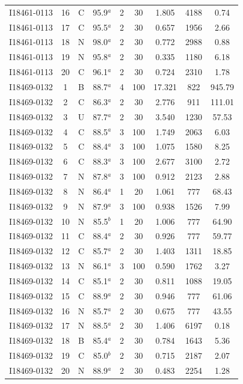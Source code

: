 \begin{table}
\begin{tabular}{ccccccccc}
I18461-0113 & 16 & C & 95.9$^{a}$ & 2 & 30 & 1.805 & 4188 & 0.74 \\
I18461-0113 & 17 & C & 95.5$^{a}$ & 2 & 30 & 0.657 & 1956 & 2.66 \\
I18461-0113 & 18 & N & 98.0$^{a}$ & 2 & 30 & 0.772 & 2988 & 0.88 \\
I18461-0113 & 19 & N & 95.8$^{a}$ & 2 & 30 & 0.335 & 1180 & 6.18 \\
I18461-0113 & 20 & C & 96.1$^{a}$ & 2 & 30 & 0.724 & 2310 & 1.78 \\
I18469-0132 & 1 & B & 88.7$^{a}$ & 4 & 100 & 17.321 & 822 & 945.79 \\
I18469-0132 & 2 & C & 86.3$^{a}$ & 2 & 30 & 2.776 & 911 & 111.01 \\
I18469-0132 & 3 & U & 87.7$^{a}$ & 2 & 30 & 3.540 & 1230 & 57.53 \\
I18469-0132 & 4 & C & 88.5$^{a}$ & 3 & 100 & 1.749 & 2063 & 6.03 \\
I18469-0132 & 5 & C & 88.4$^{a}$ & 3 & 100 & 1.075 & 1580 & 8.25 \\
I18469-0132 & 6 & C & 88.3$^{a}$ & 3 & 100 & 2.677 & 3100 & 2.72 \\
I18469-0132 & 7 & N & 87.8$^{a}$ & 3 & 100 & 0.912 & 2123 & 2.88 \\
I18469-0132 & 8 & N & 86.4$^{a}$ & 1 & 20 & 1.061 & 777 & 68.43 \\
I18469-0132 & 9 & N & 87.9$^{a}$ & 3 & 100 & 0.938 & 1526 & 7.99 \\
I18469-0132 & 10 & N & 85.5$^{b}$ & 1 & 20 & 1.006 & 777 & 64.90 \\
I18469-0132 & 11 & C & 88.4$^{a}$ & 2 & 30 & 0.926 & 777 & 59.77 \\
I18469-0132 & 12 & C & 85.7$^{a}$ & 2 & 30 & 1.403 & 1311 & 18.85 \\
I18469-0132 & 13 & N & 86.1$^{a}$ & 3 & 100 & 0.590 & 1762 & 3.27 \\
I18469-0132 & 14 & C & 85.1$^{a}$ & 2 & 30 & 0.811 & 1088 & 19.05 \\
I18469-0132 & 15 & C & 88.9$^{a}$ & 2 & 30 & 0.946 & 777 & 61.06 \\
I18469-0132 & 16 & N & 85.7$^{a}$ & 2 & 30 & 0.675 & 777 & 43.55 \\
I18469-0132 & 17 & N & 88.5$^{a}$ & 2 & 30 & 1.406 & 6197 & 0.18 \\
I18469-0132 & 18 & B & 85.4$^{a}$ & 2 & 30 & 0.784 & 1643 & 5.36 \\
I18469-0132 & 19 & C & 85.0$^{b}$ & 2 & 30 & 0.715 & 2187 & 2.07 \\
I18469-0132 & 20 & N & 88.9$^{a}$ & 2 & 30 & 0.483 & 2254 & 1.28 \\

\end{tabular}
\end{table}
